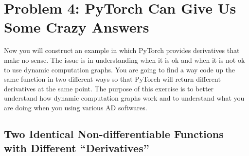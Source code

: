 \documentclass[letterpaper,11pt]{article}
\begin{document}
\section*{Problem 4: PyTorch Can Give Us Some Crazy Answers}

Now you will construct an example in which PyTorch provides derivatives that
make no sense. The issue is in understanding when it is ok and when it is not ok
to use dynamic computation graphs. You are going to find a way code up the same
function in two different ways so that PyTorch will return different derivatives
at the same point. The purpose of this exercise is to better understand how
dynamic computation graphs work and to understand what you are doing when you
using various AD softwares.

\subsection*{Two Identical Non-differentiable Functions with Different ``Derivatives''}
\end{document}
